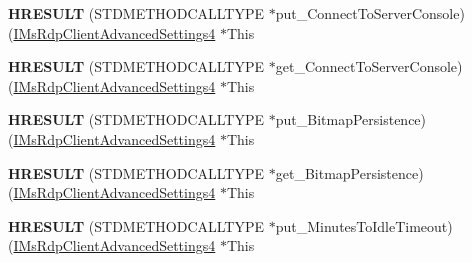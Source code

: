 \begin{DoxyCompactItemize}
\item 
\mbox{\label{struct_m_s_t_s_c_lib_1_1_i_ms_rdp_client_advanced_settings4_vtbl_a3bc2db799d96f996bdc6eb80dc904cd0}} 
{\bfseries H\+R\+E\+S\+U\+LT} (S\+T\+D\+M\+E\+T\+H\+O\+D\+C\+A\+L\+L\+T\+Y\+PE $\ast$put\+\_\+\+Connect\+To\+Server\+Console)(\hyperlink{interface_m_s_t_s_c_lib_1_1_i_ms_rdp_client_advanced_settings4}{I\+Ms\+Rdp\+Client\+Advanced\+Settings4} $\ast$This
\item 
\mbox{\label{struct_m_s_t_s_c_lib_1_1_i_ms_rdp_client_advanced_settings4_vtbl_a97381518de2b964f4cb59a9cc229bd08}} 
{\bfseries H\+R\+E\+S\+U\+LT} (S\+T\+D\+M\+E\+T\+H\+O\+D\+C\+A\+L\+L\+T\+Y\+PE $\ast$get\+\_\+\+Connect\+To\+Server\+Console)(\hyperlink{interface_m_s_t_s_c_lib_1_1_i_ms_rdp_client_advanced_settings4}{I\+Ms\+Rdp\+Client\+Advanced\+Settings4} $\ast$This
\item 
\mbox{\label{struct_m_s_t_s_c_lib_1_1_i_ms_rdp_client_advanced_settings4_vtbl_a4fafc3003a3d47572ad0fd70ef675c3d}} 
{\bfseries H\+R\+E\+S\+U\+LT} (S\+T\+D\+M\+E\+T\+H\+O\+D\+C\+A\+L\+L\+T\+Y\+PE $\ast$put\+\_\+\+Bitmap\+Persistence)(\hyperlink{interface_m_s_t_s_c_lib_1_1_i_ms_rdp_client_advanced_settings4}{I\+Ms\+Rdp\+Client\+Advanced\+Settings4} $\ast$This
\item 
\mbox{\label{struct_m_s_t_s_c_lib_1_1_i_ms_rdp_client_advanced_settings4_vtbl_aba6cdbabbc23674b743451fd275cf47a}} 
{\bfseries H\+R\+E\+S\+U\+LT} (S\+T\+D\+M\+E\+T\+H\+O\+D\+C\+A\+L\+L\+T\+Y\+PE $\ast$get\+\_\+\+Bitmap\+Persistence)(\hyperlink{interface_m_s_t_s_c_lib_1_1_i_ms_rdp_client_advanced_settings4}{I\+Ms\+Rdp\+Client\+Advanced\+Settings4} $\ast$This
\item 
\mbox{\label{struct_m_s_t_s_c_lib_1_1_i_ms_rdp_client_advanced_settings4_vtbl_aea83aef67a164f5a1242c7e3a98ba575}} 
{\bfseries H\+R\+E\+S\+U\+LT} (S\+T\+D\+M\+E\+T\+H\+O\+D\+C\+A\+L\+L\+T\+Y\+PE $\ast$put\+\_\+\+Minutes\+To\+Idle\+Timeout)(\hyperlink{interface_m_s_t_s_c_lib_1_1_i_ms_rdp_client_advanced_settings4}{I\+Ms\+Rdp\+Client\+Advanced\+Settings4} $\ast$This

\end{DoxyCompactItemize}

